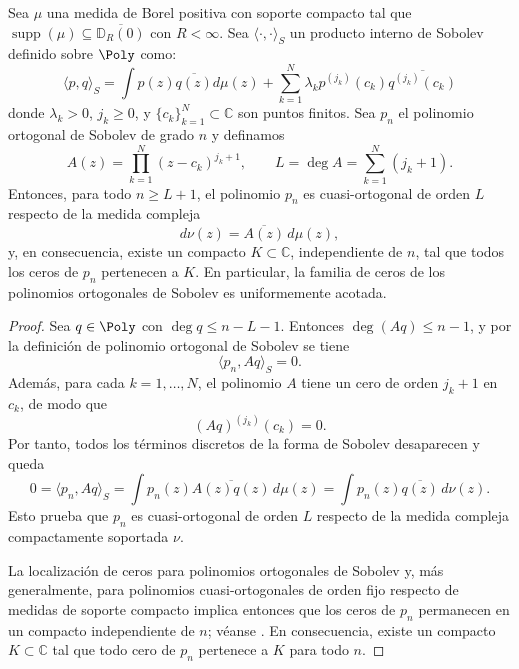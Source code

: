 \begin{thm}\label{thm:acotacion_ceros}
	Sea $\mu$ una medida de Borel positiva con soporte compacto tal que $\operatorname{supp}(\mu) \subseteq \overline{\mathbb{D}_R(0)}$ con $R < \infty$. Sea $\langle \cdot, \cdot \rangle_S$ un producto interno de Sobolev definido sobre $\Poly$ como:
	\begin{equation}\label{eq:sobolev_general}
		\langle p, q \rangle_S = \int p(z)\overline{q(z)} d\mu(z) + \sum_{k=1}^N \lambda_k p^{(j_k)}(c_k) \overline{q^{(j_k)}(c_k)}
	\end{equation}
	donde $\lambda_k > 0$, $j_k \ge 0$, y $\{c_k\}_{k=1}^N \subset \mathbb{C}$ son puntos finitos. Sea $p_n$ el polinomio ortogonal de Sobolev de grado $n$ y definamos
	\[
		A(z)=\prod_{k=1}^N (z-c_k)^{j_k+1},
		\qquad
		L = \deg A = \sum_{k=1}^N (j_k+1).
	\]
	Entonces, para todo $n \ge L+1$, el polinomio $p_n$ es cuasi-ortogonal de orden $L$ respecto de la medida compleja
	\[
		d\nu(z)=\overline{A(z)}\,d\mu(z),
	\]
	y, en consecuencia, existe un compacto $K \subset \mathbb{C}$, independiente de $n$, tal que todos los ceros de $p_n$ pertenecen a $K$. En particular, la familia de ceros de los polinomios ortogonales de Sobolev es uniformemente acotada.
\end{thm}

\begin{proof}
	Sea $q \in \Poly$ con $\deg q \le n-L-1$. Entonces $\deg(Aq) \le n-1$, y por la definición de polinomio ortogonal de Sobolev se tiene
	\[
		\langle p_n, Aq \rangle_S = 0.
	\]
	Además, para cada $k=1,\dots,N$, el polinomio $A$ tiene un cero de orden $j_k+1$ en $c_k$, de modo que
	\[
		(Aq)^{(j_k)}(c_k)=0.
	\]
	Por tanto, todos los términos discretos de la forma de Sobolev desaparecen y queda
	\[
		0 = \langle p_n, Aq \rangle_S = \int p_n(z)\overline{A(z)q(z)}\,d\mu(z) = \int p_n(z)\overline{q(z)}\,d\nu(z).
	\]
	Esto prueba que $p_n$ es cuasi-ortogonal de orden $L$ respecto de la medida compleja compactamente soportada $\nu$.

	La localización de ceros para polinomios ortogonales de Sobolev y, más generalmente, para polinomios cuasi-ortogonales de orden fijo respecto de medidas de soporte compacto implica entonces que los ceros de $p_n$ permanecen en un compacto independiente de $n$; véanse \cite{lopez1999zero,lopez2001sobolev,marcellan2015sobolev}. En consecuencia, existe un compacto $K \subset \mathbb{C}$ tal que todo cero de $p_n$ pertenece a $K$ para todo $n$.
\end{proof}

